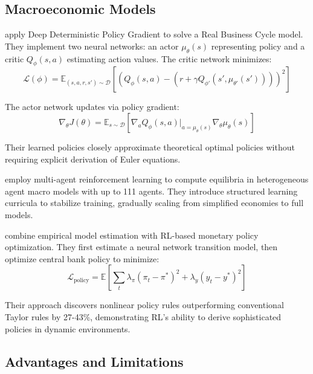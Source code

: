 \subsection{Macroeconomic Models}

\citet{AtashbarShi2023} apply Deep Deterministic Policy Gradient to solve a Real Business Cycle model. They implement two neural networks: an actor $\mu_\theta(s)$ representing policy and a critic $Q_\phi(s,a)$ estimating action values. The critic network minimizes:
\begin{equation}
\mathcal{L}(\phi) = \mathbb{E}_{(s,a,r,s') \sim \mathcal{D}} \left[ \left( Q_\phi(s, a) - \left( r + \gamma Q_{\phi'}(s', \mu_{\theta'}(s')) \right) \right)^2 \right]
\end{equation}

The actor network updates via policy gradient:
\begin{equation}
\nabla_\theta J(\theta) = \mathbb{E}_{s \sim \mathcal{D}} \left[ \nabla_a Q_\phi(s, a) \big|_{a=\mu_\theta(s)} \nabla_\theta \mu_\theta(s) \right]
\end{equation}

Their learned policies closely approximate theoretical optimal policies without requiring explicit derivation of Euler equations.

\citet{curry2022} employ multi-agent reinforcement learning to compute equilibria in heterogeneous agent macro models with up to 111 agents. They introduce structured learning curricula to stabilize training, gradually scaling from simplified economies to full models.

\citet{HinterlangTaenzer2024} combine empirical model estimation with RL-based monetary policy optimization. They first estimate a neural network transition model, then optimize central bank policy to minimize:
\begin{equation}
\mathcal{L}_\text{policy} = \mathbb{E} \left[ \sum_t \lambda_\pi (\pi_t - \pi^*)^2 + \lambda_y (y_t - y^*)^2 \right]
\end{equation}

Their approach discovers nonlinear policy rules outperforming conventional Taylor rules by 27-43\%, demonstrating RL's ability to derive sophisticated policies in dynamic environments.

\subsection{Advantages and Limitations}

